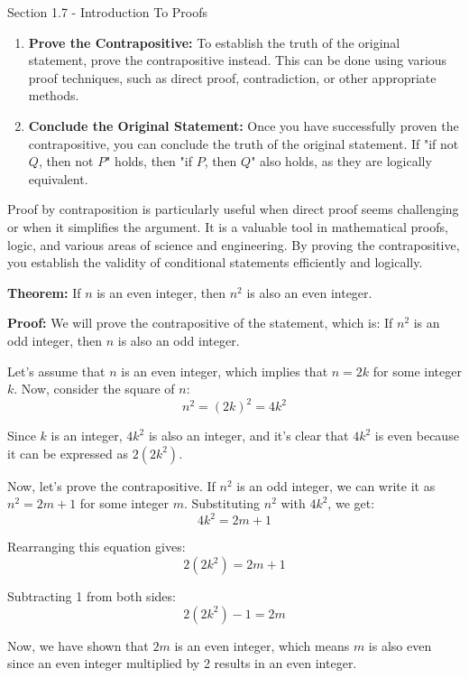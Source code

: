 \begin{notes}{Section 1.7 - Introduction To Proofs}
\begin{enumerate}
        \item \textbf{Prove the Contrapositive:} To establish the truth of the original statement, prove the contrapositive instead. This can be done using various proof techniques, such as direct proof, 
        contradiction, or other appropriate methods.
        
        \item \textbf{Conclude the Original Statement:} Once you have successfully proven the contrapositive, you can conclude the truth of the original statement. If "if not $Q$, then not $P$" holds, then "if $P$, 
        then $Q$" also holds, as they are logically equivalent.
    \end{enumerate}
    
    Proof by contraposition is particularly useful when direct proof seems challenging or when it simplifies the argument. It is a valuable tool in mathematical proofs, logic, and various areas of science and 
    engineering. By proving the contrapositive, you establish the validity of conditional statements efficiently and logically.
    
    \begin{highlight}
        \textbf{Theorem:} If $n$ is an even integer, then $n^2$ is also an even integer.
        
        
        \textbf{Proof:} We will prove the contrapositive of the statement, which is: If $n^2$ is an odd integer, then $n$ is also an odd integer.
        
        Let's assume that $n$ is an even integer, which implies that $n = 2k$ for some integer $k$. Now, consider the square of $n$:
        \[n^2 = (2k)^2 = 4k^2\]
        
        Since $k$ is an integer, $4k^2$ is also an integer, and it's clear that $4k^2$ is even because it can be expressed as $2(2k^2)$.
        
        Now, let's prove the contrapositive. If $n^2$ is an odd integer, we can write it as $n^2 = 2m + 1$ for some integer $m$. Substituting $n^2$ with $4k^2$, we get:
        \[4k^2 = 2m + 1\]
        
        Rearranging this equation gives:
        \[2(2k^2) = 2m + 1\]
        
        Subtracting 1 from both sides:
        \[2(2k^2) - 1 = 2m\]
        
        Now, we have shown that $2m$ is an even integer, which means $m$ is also even since an even integer multiplied by 2 results in an even integer.
        

\end{highlight}
\end{notes}
